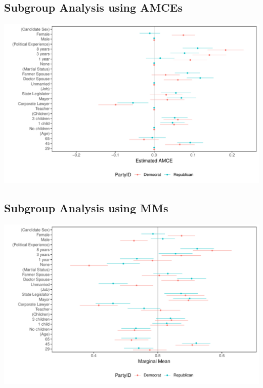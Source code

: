 \documentclass[a4paper,12pt]{article}\usepackage[]{graphicx}\usepackage[]{color}
\makeatletter
\def\maxwidth{ %
  \ifdim\Gin@nat@width>\linewidth
    \linewidth
  \else
    \Gin@nat@width
  \fi
}
\newenvironment{knitrout}{}{} %
\makeatother
\begin{document}
\clearpage

\subsection{Subgroup Analysis using AMCEs}

\begin{knitrout}
\color{fgcolor}
\includegraphics[width=\maxwidth]{figure/tkr_subgroup_amce_appendix-1} 

\end{knitrout}

\subsection{Subgroup Analysis using MMs}

\begin{knitrout}
\color{fgcolor}
\includegraphics[width=\maxwidth]{figure/tkr_subgroup_mm_appendix-1} 

\end{knitrout}
\end{document}
